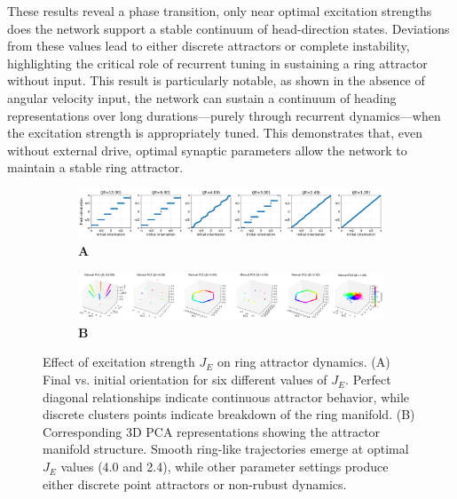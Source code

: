 \documentclass[11pt,a4paper]{article}
\begin{document}
These results reveal a phase transition, only near optimal excitation strengths does the network support a stable continuum of head-direction states. Deviations from these values lead to either discrete attractors or complete instability, highlighting the critical role of recurrent tuning in sustaining a ring attractor without input.  
This result is particularly notable, as shown in the absence of angular velocity input, the network can sustain a continuum of heading representations over long durations—purely through recurrent dynamics—when the excitation strength is appropriately tuned. This demonstrates that, even without external drive, optimal synaptic parameters allow the network to maintain a stable ring attractor.

\begin{figure}[H]
\centering
\begin{subfigure}{\textwidth}
    \centering
    \caption*{\textbf{A}}
    \includegraphics[width=\textwidth]{orientation_comparison_without_v.png}
\end{subfigure}

\vspace{0.1cm}

\begin{subfigure}{\textwidth}
    \centering
    \caption*{\textbf{B}}
    \includegraphics[width=1.0\textwidth]{manual_pca_without_v.png}
\end{subfigure}

\caption{Effect of excitation strength \( J_E \) on ring attractor dynamics. (A) Final vs. initial orientation for six different values of \( J_E \). Perfect diagonal relationships indicate continuous attractor behavior, while discrete clusters points indicate breakdown of the ring manifold. 
(B) Corresponding 3D PCA representations showing the attractor manifold structure. Smooth ring-like trajectories emerge at optimal \( J_E \) values (4.0 and 2.4), while other parameter settings produce either discrete point attractors or non-rubust dynamics.}
\label{fig:je_parameter_sweep}
\end{figure}
\end{document}
